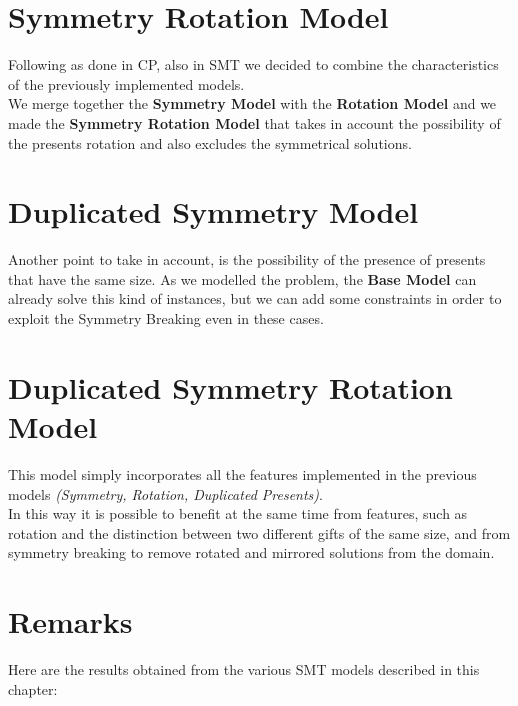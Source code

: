 \section{Symmetry Rotation Model}
Following as done in CP, also in SMT we decided to combine the characteristics of the previously implemented models.\\
We merge together the \textbf{Symmetry Model} with the \textbf{Rotation Model} and we made
the \textbf{Symmetry Rotation Model} that takes in account the possibility of the presents rotation and also excludes the symmetrical
solutions.

\section{Duplicated Symmetry Model}
Another point to take in account, is the possibility of the presence of presents that have the same size. As we modelled the problem,
the \textbf{Base Model} can already solve this kind of instances, but we can add some constraints in order to exploit the Symmetry Breaking
even in these cases.

\section{Duplicated Symmetry Rotation Model}

This model simply incorporates all the features implemented in the previous models \textit{(Symmetry, Rotation, Duplicated Presents)}.
\\
In this way it is possible to benefit at the same time from features, such as rotation and the distinction between two different gifts of the same size, and from symmetry breaking to remove rotated and mirrored solutions from the domain.  

\section{Remarks}

Here are the results obtained from the various SMT models described in this chapter: